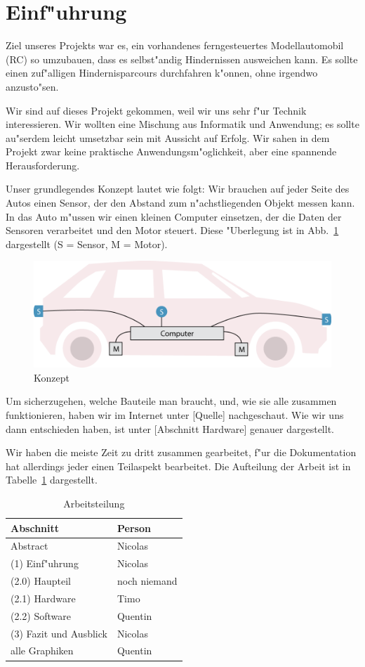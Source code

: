 \documentclass[a4paper,12pt]{article}
\begin{document}
\section{Einf"uhrung}\label{sec1}

Ziel unseres Projekts war es, ein vorhandenes ferngesteuertes Modellautomobil (RC) so umzubauen, dass es selbst"andig Hindernissen ausweichen kann.
Es sollte einen zuf"alligen Hindernisparcours durchfahren k"onnen, ohne irgendwo anzusto"sen.

Wir sind auf dieses Projekt gekommen, weil wir uns sehr f"ur Technik interessieren.
Wir wollten eine Mischung aus Informatik und Anwendung; es sollte au"serdem leicht umsetzbar sein mit Aussicht auf Erfolg.
Wir sahen in dem Projekt zwar keine praktische Anwendungsm"oglichkeit, aber eine spannende Herausforderung.

Unser grundlegendes Konzept lautet wie folgt:
Wir brauchen auf jeder Seite des Autos einen Sensor, der den Abstand zum n"achstliegenden Objekt messen kann.
In das Auto m"ussen wir einen kleinen Computer einsetzen, der die Daten der Sensoren verarbeitet und den Motor steuert.
Diese "Uberlegung ist in Abb.~\ref{Fig1} dargestellt (S = Sensor, M = Motor).

\begin{figure}[h]
	\centering
	\includegraphics[width=12cm]{./media/overview.png}
	\caption{Konzept}
	\label{Fig1}
\end{figure}

Um sicherzugehen, welche Bauteile man braucht, und, wie sie alle zusammen funktionieren, haben wir im Internet unter [Quelle] nachgeschaut.
Wie wir uns dann entschieden haben, ist unter [Abschnitt Hardware] genauer dargestellt.

Wir haben die meiste Zeit zu dritt zusammen gearbeitet, f"ur die Dokumentation hat allerdings jeder einen Teilaspekt bearbeitet.
Die Aufteilung der Arbeit ist in Tabelle~\ref{Tab1} dargestellt.

\begin{table}[h]
	\centering
	\begin{tabular}{|l|l|}
	\hline
		Abschnitt & Person \\ \hline
		Abstract & Nicolas \\
		(1) Einf"uhrung & Nicolas \\
		(2.0) Haupteil & noch niemand \\
		(2.1) Hardware & Timo \\
		(2.2) Software & Quentin \\
		(3) Fazit und Ausblick & Nicolas \\
		alle Graphiken & Quentin \\
	\hline
	\end{tabular}
	\caption{Arbeitsteilung}
	\label{Tab1}
\end{table}
\end{document}
